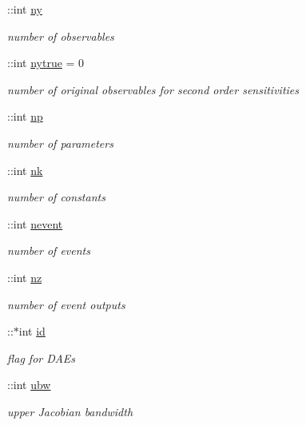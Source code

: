 \begin{DoxyCompactItemize}
\+::int \hyperlink{classamimodel_a289ca425eb368f1d582b6be2be0d3dfc}{ny}
\begin{DoxyCompactList}\small\item\em number of observables \end{DoxyCompactList}\item 
\+::int \hyperlink{classamimodel_ac91d7b36031ec122abc9f739692b02e8}{nytrue} = 0
\begin{DoxyCompactList}\small\item\em number of original observables for second order sensitivities \end{DoxyCompactList}\item 
\+::int \hyperlink{classamimodel_a6f6e2fe71b05c4c2f2d967ce9ca02dfd}{np}
\begin{DoxyCompactList}\small\item\em number of parameters \end{DoxyCompactList}\item 
\+::int \hyperlink{classamimodel_afd6bea572754e0c3c320664bdccf0200}{nk}
\begin{DoxyCompactList}\small\item\em number of constants \end{DoxyCompactList}\item 
\+::int \hyperlink{classamimodel_aab5c7f06273122b68624eb3bca6a9b6e}{nevent}
\begin{DoxyCompactList}\small\item\em number of events \end{DoxyCompactList}\item 
\+::int \hyperlink{classamimodel_a79f11413e5bfe18a0e71e17574399ad5}{nz}
\begin{DoxyCompactList}\small\item\em number of event outputs \end{DoxyCompactList}\item 
\+::$\ast$int \hyperlink{classamimodel_acf2488b95c97e0378c9bf49de3b50f28}{id}
\begin{DoxyCompactList}\small\item\em flag for D\+A\+Es \end{DoxyCompactList}\item 
\+::int \hyperlink{classamimodel_a955c9d10635afed4ebc04c60010e5d40}{ubw}
\begin{DoxyCompactList}\small\item\em upper Jacobian bandwidth \end{DoxyCompactList}\item 

\end{DoxyCompactItemize}
